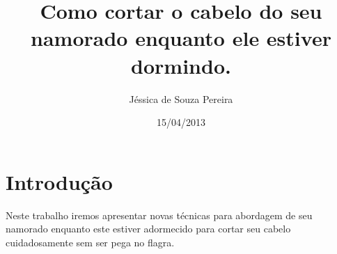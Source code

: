 \documentclass{article}
\author{Jéssica de Souza Pereira}
\date{15/04/2013}
\title{Como cortar o cabelo do seu namorado enquanto ele estiver dormindo.}
\begin{document}
\maketitle
\newpage
\section{Introdução}
Neste trabalho iremos apresentar novas técnicas para abordagem de seu namorado enquanto este estiver adormecido para cortar seu cabelo cuidadosamente sem ser pega no flagra.
\end{document}
